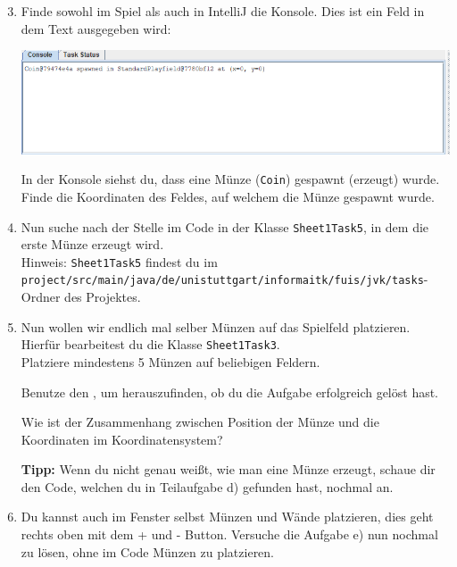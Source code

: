     \begin{enumerate}\setcounter{enumi}{2}

        \item Finde sowohl im Spiel als auch in IntelliJ die Konsole. Dies ist ein Feld in dem Text ausgegeben wird:
        \begin{center}
        \includegraphics[width=\linewidth]{./figures/console.PNG}
        \end{center}
        
        In der Konsole siehst du, dass eine Münze (\texttt{Coin}) gespawnt (erzeugt) wurde.
        Finde die Koordinaten des Feldes, auf welchem die Münze gespawnt wurde.
        
        \item Nun suche nach der Stelle im Code in der Klasse \lstinline{Sheet1Task5}, in dem die erste Münze erzeugt wird.\\
        Hinweis: \lstinline{Sheet1Task5} findest du im \lstinline{project/src/main/java/de/unistuttgart/informaitk/fuis/jvk/tasks}-Ordner des Projektes.
        
        \item Nun wollen wir endlich mal selber Münzen auf das Spielfeld platzieren.
        Hierfür bearbeitest du die Klasse \lstinline{Sheet1Task3}.\\
        Platziere mindestens 5 Münzen auf beliebigen Feldern.
        
        Benutze den , um herauszufinden, ob du die Aufgabe erfolgreich gelöst hast.
        
        Wie ist der Zusammenhang zwischen Position der Münze und die Koordinaten im Koordinatensystem?
        
        \textbf{Tipp:} Wenn du nicht genau weißt, wie man eine Münze erzeugt, schaue dir den Code, welchen du in Teilaufgabe d) gefunden hast, nochmal an.
        \item Du kannst auch im Fenster selbst Münzen und Wände platzieren, dies geht rechts oben mit dem + und - Button. Versuche die Aufgabe e) nun nochmal zu lösen, ohne im Code Münzen zu platzieren.
        \end{enumerate}
